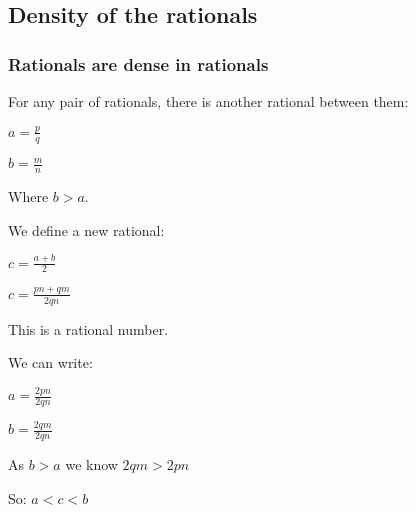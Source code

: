 \subsection{Density of the rationals}

\subsubsection{Rationals are dense in rationals}

For any pair of rationals, there is another rational between them:

$a=\frac{p}{q}$

$b=\frac{m}{n}$

Where \(b>a\).

We define a new rational:

$c=\frac{a+b}{2}$

$c=\frac{pn+qm}{2qn}$

This is a rational number.

We can write:

$a=\frac{2pn}{2qn}$

$b=\frac{2qm}{2qn}$

As \(b>a\) we know \(2qm>2pn\)

So: \(a < c < b\)

